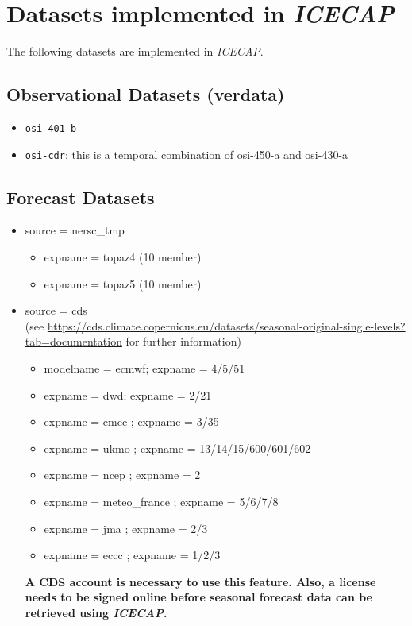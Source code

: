 \documentclass[DIV=10, parskip=full]{scrreprt}
\newcommand{\ice}{\textit{ICECAP}\xspace}
\begin{document}
\section{Datasets implemented in \ice} \label{chap:data}
The following datasets are implemented in \ice.

\subsection{Observational Datasets (verdata)}

\begin{itemize}
		\item \texttt{osi-401-b}
		\item \texttt{osi-cdr}: this is a temporal combination of osi-450-a and osi-430-a
\end{itemize}
	
\subsection{Forecast Datasets}
\begin{itemize}
	\item source = nersc\_tmp
	\begin{itemize}
		\item expname = topaz4 (10 member)
		\item expname = topaz5 (10 member)
	\end{itemize}
	\item source = cds \\
	(see \url{https://cds.climate.copernicus.eu/datasets/seasonal-original-single-levels?tab=documentation} for further information)
	\begin{itemize}
		\item modelname = ecmwf; expname = 4/5/51
		\item expname = dwd; expname = 2/21
		\item expname = cmcc ; expname = 3/35
		\item expname = ukmo ; expname = 13/14/15/600/601/602
		\item expname = ncep ; expname = 2
		\item expname = meteo\_france ; expname = 5/6/7/8
		\item expname = jma ; expname = 2/3
		\item expname = eccc ; expname = 1/2/3
	\end{itemize}
	\textbf{A CDS account is necessary to use this feature. Also, a license needs to be signed online before seasonal forecast data can be retrieved using \ice.}
\end{itemize}
\end{document}
